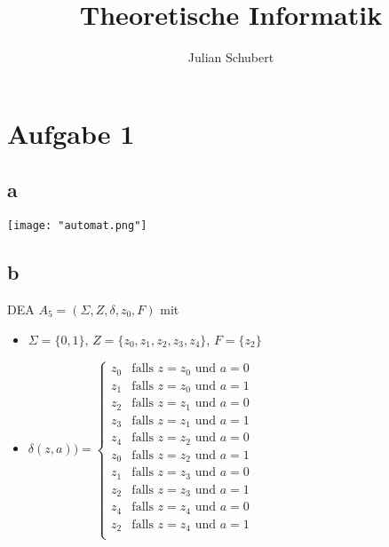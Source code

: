 \documentclass[14pt]{article}
\title{Theoretische Informatik}
\author{Julian Schubert}
\begin{document}
\section*{Aufgabe 1}
\subsection*{a}

\texttt{[image: "automat.png"]}
\subsection*{b}
DEA $A_5 = (\varSigma, Z, \delta, z_0, F)$ mit
\begin{itemize}
    \item $\varSigma = \{0, 1\}$, $Z = \{ z_0, z_1, z_2, z_3, z_4\}$, $F = \{ z_ 2 \}$
    \item $
        \delta(z, a)) =
        \begin{cases}
            z_0     & \text{falls $z = z_0$ und $a = 0$}             \\
            z_1     & \text{falls $z = z_0$ und $a = 1$}             \\

            z_2     & \text{falls $z = z_1$ und $a = 0$}             \\
            z_3     & \text{falls $z = z_1$ und $a = 1$}             \\

            z_4     & \text{falls $z = z_2$ und $a = 0$}             \\
            z_0     & \text{falls $z = z_2$ und $a = 1$}             \\

            z_1     & \text{falls $z = z_3$ und $a = 0$}             \\
            z_2     & \text{falls $z = z_3$ und $a = 1$}             \\

            z_4     & \text{falls $z = z_4$ und $a = 0$}             \\
            z_2     & \text{falls $z = z_4$ und $a = 1$}             \\

        \end{cases}
    $
\end{itemize}
\end{document}
